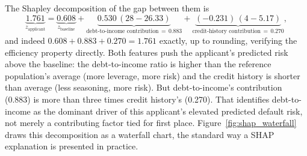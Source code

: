 \documentclass[../ai_in_finance]{subfiles}
\begin{document}
The Shapley decomposition of the gap between them is
\begin{equation*}
\underbrace{1.761}_{z_{\text{applicant}}} = \underbrace{0.608}_{z_{\text{baseline}}} + \underbrace{0.530\,(28 - 26.33)}_{\text{debt-to-income contribution} \,=\, 0.883} + \underbrace{(-0.231)\,(4 - 5.17)}_{\text{credit-history contribution} \,=\, 0.270},
\end{equation*}
and indeed $0.608 + 0.883 + 0.270 = 1.761$ exactly, up to rounding, verifying the efficiency property directly. Both features push the applicant's predicted risk above the baseline: the debt-to-income ratio is higher than the reference population's average (more leverage, more risk) and the credit history is shorter than average (less seasoning, more risk). But debt-to-income's contribution (0.883) is more than three times credit history's (0.270). That identifies debt-to-income as the dominant driver of this applicant's elevated predicted default risk, not merely a contributing factor tied for first place. Figure~\ref{fig:shap_waterfall} draws this decomposition as a waterfall chart, the standard way a SHAP explanation is presented in practice.

\begin{figure}[htbp]
\centering
\begin{lrbox}{\bookmeasuredbox}
\end{lrbox}
\ifdim\wd\bookmeasuredbox<0.65\linewidth
\setlength{\bookcapwidth}{0.65\linewidth}
\else
\setlength{\bookcapwidth}{\wd\bookmeasuredbox}
\fi
{}
\end{figure}
\end{document}
